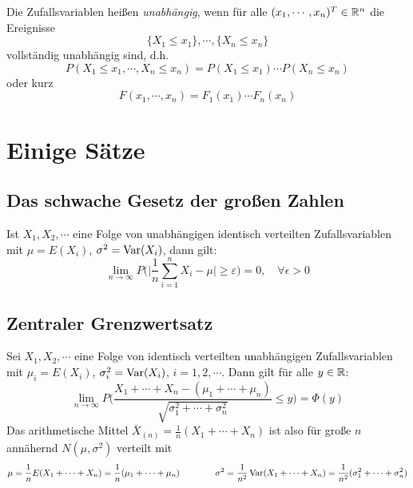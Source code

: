             Die Zufallsvariablen heißen \textit{unabhängig}, wenn für alle \( (x_1, \cdots, x_n)^T \in \mathbb{R}^n \) die Ereignisse \[ \{ X_1 \leq x_1 \}, \cdots, \{ X_n \leq x_n \} \] vollständig unabhängig sind, d.h. \[ P(X_1 \leq x_1, \cdots, X_n \leq x_n) = P(X_1 \leq x_1) \cdots P(X_n \leq x_n) \] oder kurz \[ F(x_1, \cdots, x_n) = F_1(x_1) \cdots F_n(x_n) \]

    \section{Einige Sätze}
        \subsection{Das schwache Gesetz der großen Zahlen}
            Ist \( X_1, X_2, \cdots \) eine Folge von unabhängigen identisch verteilten Zufallsvariablen mit \( \mu = E(X_i) \), \( \sigma^2 = \operatorname{Var}(X_i) \), dann gilt:
            \begin{equation*}
                \lim\limits_{n \rightarrow \infty} P\Bigg( \bigg\lvert\frac{1}{n} \sum_{i = 1}^{n} X_i - \mu\bigg\rvert \geq \varepsilon \Bigg) = 0, \quad \forall \epsilon > 0
            \end{equation*}

        \subsection{Zentraler Grenzwertsatz}
            Sei \( X_1, X_2, \cdots \) eine Folge von identisch verteilten unabhängigen Zufallsvariablen mit \( \mu_i = E(X_i) \), \( \sigma_i^2 = \operatorname{Var}(X_i) \), \( i = 1, 2, \cdots \). Dann gilt für alle \( y \in \mathbb{R} \):
            \begin{equation*}
                \lim\limits_{n \rightarrow \infty} P\Bigg( \frac{X_1 + \cdots + X_n - (\mu_1 + \cdots + \mu_n)}{\sqrt{\sigma_1^2 + \cdots + \sigma_n^2}} \leq y \Bigg) = \Phi(y)
            \end{equation*}
            Das arithmetische Mittel \( \bar{X}_{(n)} = \frac{1}{n} (X_1 + \cdots + X_n) \) ist also für große \(n\) annähernd \( N(\mu, \sigma^2) \) verteilt mit
            \begin{equation*}
                \mu = \frac{1}{n} E(X_1 + \cdots + X_n) = \frac{1}{n} (\mu_1 + \cdots + \mu_n) \qquad\qquad \sigma^2 = \frac{1}{n^2} \operatorname{Var}(X_1 + \cdots + X_n) = \frac{1}{n^2} (\sigma_1^2 + \cdots + \sigma_n^2)
            \end{equation*}
            
